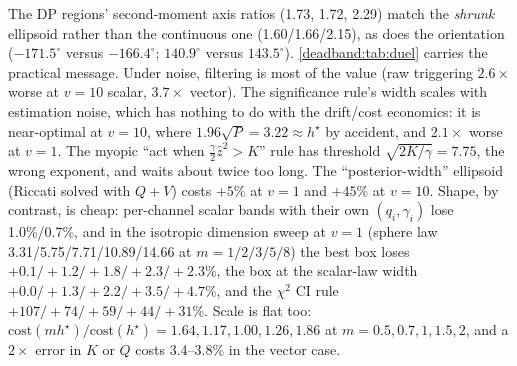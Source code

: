 The DP regions' second-moment axis ratios (1.73, 1.72, 2.29) match the \emph{shrunk} ellipsoid rather than the continuous one (1.60/1.66/2.15), as does the orientation ($-171.5^\circ$ versus $-166.4^\circ$; $140.9^\circ$ versus $143.5^\circ$). \cref{deadband:tab:duel} carries the practical message. Under noise, filtering is most of the value (raw triggering $2.6\times$ worse at $v = 10$ scalar, $3.7\times$ vector). The significance rule's width scales with estimation noise, which has nothing to do with the drift/cost economics: it is near-optimal at $v = 10$, where $1.96\sqrt P = 3.22 \approx h^\star$ by accident, and $2.1\times$ worse at $v = 1$. The myopic ``act when $\tfrac{\gamma}{2}\hat z^2 > K$'' rule has threshold $\sqrt{2K/\gamma} = 7.75$, the wrong exponent, and waits about twice too long. The ``posterior-width'' ellipsoid (Riccati solved with $Q + V$) costs $+5\%$ at $v = 1$ and $+45\%$ at $v = 10$. Shape, by contrast, is cheap: per-channel scalar bands with their own $(q_i, \gamma_i)$ lose 1.0\%/0.7\%, and in the isotropic dimension sweep at $v = 1$ (sphere law 3.31/5.75/7.71/10.89/14.66 at $m = 1/2/3/5/8$) the best box loses $+0.1/+1.2/+1.8/+2.3/+2.3\%$, the box at the scalar-law width $+0.0/+1.3/+2.2/+3.5/+4.7\%$, and the $\chi^2$ CI rule $+107/+74/+59/+44/+31\%$. Scale is flat too: $\mathrm{cost}(mh^\star)/\mathrm{cost}(h^\star) = 1.64, 1.17, 1.00, 1.26, 1.86$ at $m = 0.5, 0.7, 1, 1.5, 2$, and a $2\times$ error in $K$ or $Q$ costs 3.4--3.8\% in the vector case.

